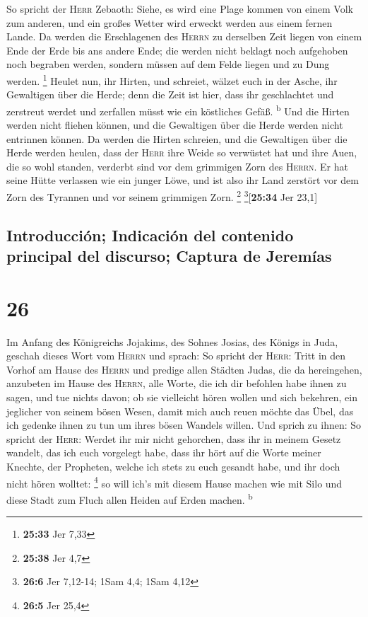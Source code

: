  So spricht der \textsc{Herr} Zebaoth: Siehe, es wird
eine Plage kommen von einem Volk zum anderen, und ein großes Wetter wird
erweckt werden aus einem fernen Lande.  Da werden die
Erschlagenen des \textsc{Herrn} zu derselben Zeit liegen von einem Ende
der Erde bis ans andere Ende; die werden nicht beklagt noch aufgehoben
noch begraben werden, sondern müssen auf dem Felde liegen und zu Dung
werden. \footnote{\textbf{25:33} Jer 7,33}  Heulet nun,
ihr Hirten, und schreiet, wälzet euch in der Asche, ihr Gewaltigen über
die Herde; denn die Zeit ist hier, dass ihr geschlachtet und zerstreut
werdet und zerfallen müsst wie ein köstliches Gefäß. \textsuperscript{b}
 Und die Hirten werden nicht fliehen können, und die
Gewaltigen über die Herde werden nicht entrinnen können. 
Da werden die Hirten schreien, und die Gewaltigen über die Herde werden
heulen, dass der \textsc{Herr} ihre Weide so verwüstet hat
 und ihre Auen, die so wohl standen, verderbt sind vor
dem grimmigen Zorn des \textsc{Herrn}.  Er hat seine
Hütte verlassen wie ein junger Löwe, und ist also ihr Land zerstört vor
dem Zorn des Tyrannen und vor seinem grimmigen Zorn. \footnote{\textbf{25:38}
  Jer 4,7} \footnote{\textbf{26:6} Jer 7,12-14; 1Sam 4,4; 1Sam 4,12}{[}\textbf{25:34}
Jer 23,1{]}

\hypertarget{introducciuxf3n-indicaciuxf3n-del-contenido-principal-del-discurso-captura-de-jeremuxedas}{%
\subsection{Introducción; Indicación del contenido principal del
discurso; Captura de
Jeremías}\label{introducciuxf3n-indicaciuxf3n-del-contenido-principal-del-discurso-captura-de-jeremuxedas}}

\hypertarget{section-25}{%
\section{26}\label{section-25}}

 Im Anfang des Königreichs Jojakims, des Sohnes Josias,
des Königs in Juda, geschah dieses Wort vom \textsc{Herrn} und sprach:
 So spricht der \textsc{Herr}: Tritt in den Vorhof am
Hause des \textsc{Herrn} und predige allen Städten Judas, die da
hereingehen, anzubeten im Hause des \textsc{Herrn}, alle Worte, die ich
dir befohlen habe ihnen zu sagen, und tue nichts davon; 
ob sie vielleicht hören wollen und sich bekehren, ein jeglicher von
seinem bösen Wesen, damit mich auch reuen möchte das Übel, das ich
gedenke ihnen zu tun um ihres bösen Wandels willen.  Und
sprich zu ihnen: So spricht der \textsc{Herr}: Werdet ihr mir nicht
gehorchen, dass ihr in meinem Gesetz wandelt, das ich euch vorgelegt
habe,  dass ihr hört auf die Worte meiner Knechte, der
Propheten, welche ich stets zu euch gesandt habe, und ihr doch nicht
hören wolltet: \footnote{\textbf{26:5} Jer 25,4}  so will
ich's mit diesem Hause machen wie mit Silo und diese Stadt zum Fluch
allen Heiden auf Erden machen. \textsuperscript{b}

